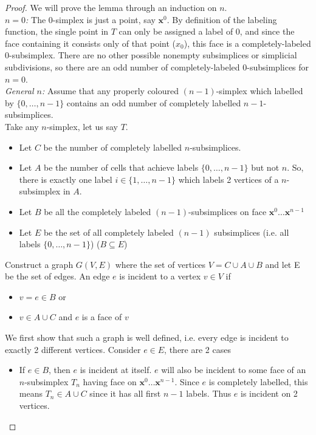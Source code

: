 \documentclass{article}
\theoremstyle{definition}
\begin{document}
\begin{proof}
We will prove the lemma through an induction on $n$.\\

\textit{$n=0$:} The $0$-simplex is just a point, say $\mathbf{x}^0$. By definition of the labeling function, the single point in $T$ can only be assigned a label of $0$, and since the face containing it consists only of that point ($x_0$), this face is a completely-labeled $0$-subsimplex. There are no other possible nonempty subsimplices or simplicial subdivisions, so there are an odd number of completely-labeled $0$-subsimplices for $n = 0$.\\

\textit{General $n$:} Assume that any properly coloured $(n-1)$-simplex which labelled by $\{0,\dots,n-1\}$ contains an odd number of completely labelled $n-1$-subsimplices.\\

Take any $n$-simplex, let us say $T$. 
\begin{itemize}
\item Let $C$ be the number of completely labelled $n$-subsimplices. 
\item Let $A$ be the number of cells that achieve labels $\{0,\dots ,n-1\}$ but not $n$. So, there is exactly one label $i \in \{1,\dots,n-1\}$ which labels 2 vertices of a $n$-subsimplex in $A$.
\item Let $B$ be all the completely labeled $(n-1)$-subsimplices on face $\mathbf{x}^0 \dots \mathbf{x}^{n-1}$
\item Let $E$ be the set of all completely labeled $(n-1)$ subsimplices (i.e. all labels $\{0,\dots,n-1\}$) ($B\subseteq E$)
\end{itemize}
Construct a graph $G(V,E)$ where the set of vertices $V = C\cup A\cup B$ and let E be the set of edges. An edge $e$ is incident to a vertex $v\in V$ if
\begin{itemize}
	\item $v = e \in B$ or
	\item $v \in A\cup C$ and $e$ is a face of $v$
\end{itemize}
We first show that such a graph is well defined, i.e. every edge is incident to exactly 2 different vertices. Consider $e \in E$, there are 2 cases
\begin{itemize}
	\item If $e \in B$, then $e$ is incident at itself. $e$ will also be incident to some face of an $n$-subsimplex $T_n$ having face on $\mathbf{x}^0 \dots \mathbf{x}^{n-1}$. Since $e$ is completely labelled, this means $T_n \in A\cup C$ since it has all first $n-1$ labels. Thus $e$ is incident on 2 vertices.


\end{itemize}
\end{proof}
\end{document}
